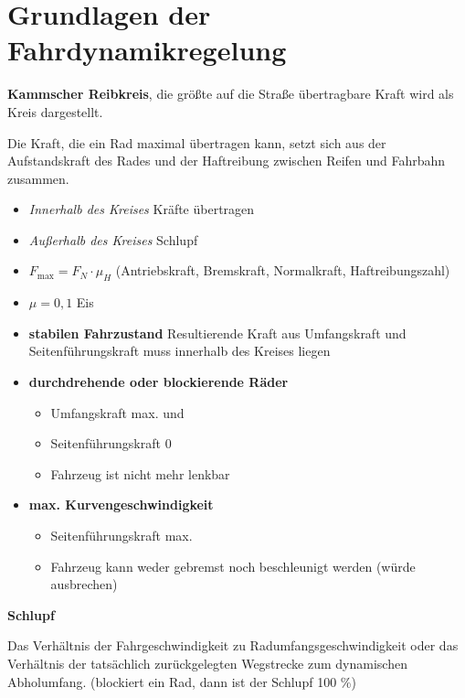 \section{Grundlagen der
Fahrdynamikregelung}\label{grundlagen-der-fahrdynamikregelung}

\textbf{Kammscher Reibkreis}, die größte auf die Straße übertragbare
Kraft wird als Kreis dargestellt.

Die Kraft, die ein Rad maximal übertragen kann, setzt sich aus der
Aufstandskraft des Rades und der Haftreibung zwischen Reifen und
Fahrbahn zusammen.

\begin{itemize}
\item
  \emph{Innerhalb des Kreises} Kräfte übertragen
\item
  \emph{Außerhalb des Kreises} Schlupf
\item
  $F_\text{max} = F_N \cdot \mu_H$ (Antriebskraft, Bremskraft,
  Normalkraft, Haftreibungszahl)
\item
  $\mu = 0,1$ Eis
\item
  \textbf{stabilen Fahrzustand} Resultierende Kraft aus Umfangskraft und
  Seitenführungskraft muss innerhalb des Kreises liegen
\item
  \textbf{durchdrehende oder blockierende Räder}

  \begin{itemize}
  \item
    Umfangskraft max. und
  \item
    Seitenführungskraft 0
  \item
    Fahrzeug ist nicht mehr lenkbar
  \end{itemize}
\item
  \textbf{max. Kurvengeschwindigkeit}

  \begin{itemize}
  \item
    Seitenführungskraft max.
  \item
    Fahrzeug kann weder gebremst noch beschleunigt werden (würde
    ausbrechen)
  \end{itemize}
\end{itemize}

\textbf{Schlupf}

Das Verhältnis der Fahrgeschwindigkeit zu Radumfangsgeschwindigkeit oder
das Verhältnis der tatsächlich zurückgelegten Wegstrecke zum dynamischen
Abholumfang. (blockiert ein Rad, dann ist der Schlupf 100 \%)

